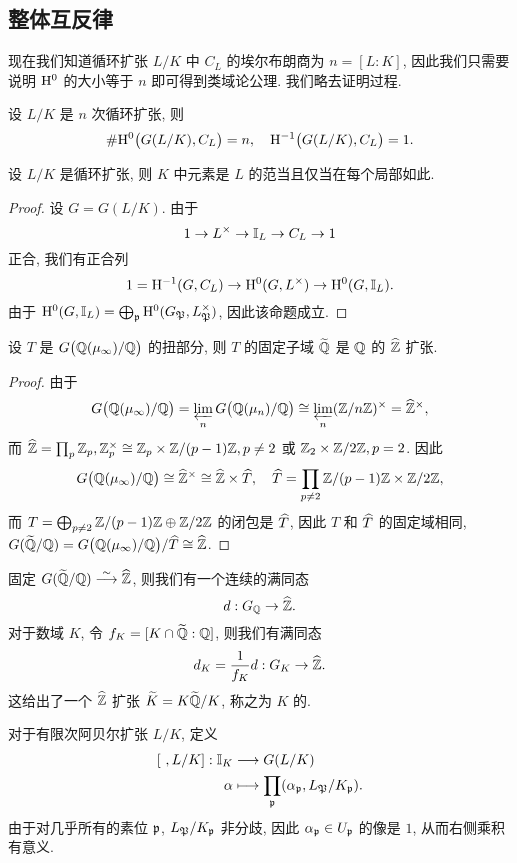\subsection{整体互反律}
现在我们知道循环扩张 $L/K$ 中 $C_L$ 的埃尔布朗商为 $n=[L:K]$, 因此我们只需要说明 $\rmH^0$ 的大小等于 $n$ 即可得到类域论公理. 我们略去证明过程.
\begin{theorem}{}{}
设 $L/K$ 是 $n$ 次循环扩张, 则
  \[\#\rmH^0\bigl(G(L/K),C_L\bigr)=n,\quad \rmH^{-1}\bigl(G(L/K),C_L\bigr)=1.\]
\end{theorem}
\begin{corollary}{}{}
设 $L/K$ 是循环扩张, 则 $K$ 中元素是 $L$ 的范当且仅当在每个局部如此.
\end{corollary}
\begin{proof}
设 $G=G(L/K)$.
由于
  \[1\ra L^\times\ra \BI_L\ra C_L\ra 1\]
正合, 我们有正合列
  \[1=\rmH^{-1}(G,C_L)\ra \rmH^0(G,L^\times)\ra \rmH^0(G,\BI_L).\]
由于 $\rmH^0(G,\BI_L)=\bigoplus_\fp \rmH^0(G_\fP,L_\fP^\times)$, 因此该命题成立.
\end{proof}

\begin{proposition}{}{}
设 $T$ 是 $G\bigl(\BQ(\mu_\infty)/\BQ\bigr)$ 的扭部分, 则 $T$ 的固定子域 $\wt\BQ$ 是 $\BQ$ 的 $\wh \BZ$ 扩张. 
\end{proposition}
\begin{proof}
由于
  \[G\bigl(\BQ(\mu_\infty)/\BQ\bigr)=\plim_n G\bigl(\BQ(\mu_n)/\BQ\bigr)\cong \plim_n (\BZ/n\BZ)^\times=\wh \BZ^\times,\]
而 $\wh \BZ=\prod_p \BZ_p,\BZ_p^\times\cong \BZ_p\times \BZ/(p-1)\BZ,p\neq 2$ 或 $\BZ_2\times \BZ/2\BZ,p=2$. 因此
  \[G\bigl(\BQ(\mu_\infty)/\BQ\bigr)\cong\wh \BZ^\times\cong \wh \BZ\times\wh T,\quad \wh T=\prod_{p\neq 2}\BZ/(p-1)\BZ\times \BZ/2\BZ,\]
而 $T=\bigoplus_{p\neq 2} \BZ/(p-1)\BZ\oplus \BZ/2\BZ$ 的闭包是 $\wh T$, 因此 $T$ 和 $\wh T$ 的固定域相同, $G(\wt \BQ/\BQ)=G\bigl(\BQ(\mu_\infty)/\BQ\bigr)/\wh T\cong \wh \BZ$.
\end{proof}

固定 $G(\wt \BQ/\BQ)\simto \wh\BZ$, 则我们有一个连续的满同态
  \[d:G_\BQ\to\wh \BZ.\]
对于数域 $K$, 令 $f_K=[K\cap \wt \BQ:\BQ]$, 则我们有满同态
  \[d_K=\frac{1}{f_K}d:G_K\to \wh\BZ.\]
这给出了一个 $\wh\BZ$ 扩张 $\wt K=K\wt\BQ/K$, 称之为 $K$ 的.

对于有限次阿贝尔扩张 $L/K$, 定义
  \[\fct{[~,L/K]:\BI_K}{G(L/K)}{\alpha}{\prod_\fp(\alpha_\fp,L_\fP/K_\fp).}\]
由于对几乎所有的素位 $\fp$, $L_\fP/K_\fp$ 非分歧, 因此 $\alpha_\fp\in U_\fp$ 的像是 $1$, 从而右侧乘积有意义.

